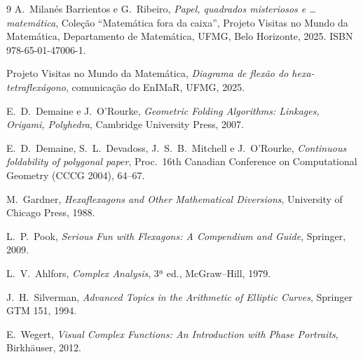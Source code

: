 \documentclass[11pt,a4paper]{article}
\theoremstyle{plain}
\theoremstyle{definition}
\theoremstyle{remark}
\begin{document}
\begin{thebibliography}{9}
A.~Milanés Barrientos e G.~Ribeiro,
\emph{Papel, quadrados misteriosos e \ldots matemática}, Coleção
``Matemática fora da caixa'', Projeto Visitas no Mundo da Matemática,
Departamento de Matemática, UFMG, Belo Horizonte, 2025.
ISBN 978-65-01-47006-1.

Projeto Visitas no Mundo da Matemática, \emph{Diagrama de flexão do
hexa-tetraflexágono}, comunicação do EnIMaR, UFMG, 2025.

E.~D.~Demaine e J.~O'Rourke, \emph{Geometric Folding Algorithms: Linkages,
Origami, Polyhedra}, Cambridge University Press, 2007.

E.~D.~Demaine, S.~L.~Devadoss, J.~S.~B.~Mitchell e J.~O'Rourke,
\emph{Continuous foldability of polygonal paper}, Proc.\ 16th Canadian
Conference on Computational Geometry (CCCG 2004), 64--67.

M.~Gardner, \emph{Hexaflexagons and Other Mathematical Diversions},
University of Chicago Press, 1988.

L.~P.~Pook, \emph{Serious Fun with Flexagons: A Compendium and Guide},
Springer, 2009.

L.~V.~Ahlfors, \emph{Complex Analysis}, 3ª ed., McGraw--Hill, 1979.

J.~H.~Silverman, \emph{Advanced Topics in the Arithmetic of Elliptic Curves},
Springer GTM 151, 1994.

E.~Wegert, \emph{Visual Complex Functions: An Introduction with Phase Portraits},
Birkhäuser, 2012.
\end{thebibliography}
\end{document}
